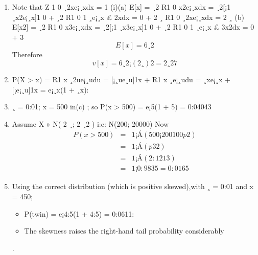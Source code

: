 \documentclass[a4paper,12pt]{article}
\begin{document}
\begin{enumerate}
\item  Note that Z 1
0
¸2xe¡¸xdx = 1
(i)(a)
E[x] = ¸2 R1
0 x2e¡¸xdx = ¸2[¡1
¸x2e¡¸x]1
0 + ¸2 R1
0
1
¸e¡¸x £ 2xdx
= 0 + 2
¸
R1
0 ¸2xe¡¸xdx = 2
¸
(b)
E[x2] = ¸2 R1
0 x3e¡¸xdx = ¸2[¡1
¸x3e¡¸x]1
0 + ¸2 R1
0
1
¸e¡¸x £ 3x2dx
= 0 + 3
\[E[x] = 6
¸2\]
Therefore
\[v[x] =
6
¸2
¡ (
2
¸
)2 =
2
¸2
7\]
\item P(X > x) =
R1
x ¸2ue¡¸udu = [¡¸ue¸u]1x
+
R1
x ¸e¡¸udu
= ¸xe¡¸x + [¡e¡¸u]1x
= e¡¸x(1 + ¸x):
\item  ¸ = 0:01; x = 500 in(c) ; so P(x > 500) = e¡5(1 + 5) = 0:04043
\item Assume X » N( 2
¸; 2
¸2 ) i:e: N(200; 20000)
Now
\begin{eqnarray*}
P(x > 500) &=& 1 ¡ Á( 500¡200
100
p2 ) \\
&=& 1 ¡ Á(p3 2 )\\
&=& 1 ¡ Á(2:1213) \\
&=& 1 ¡ 0:9835 = 0:0165
\end{eqnarray*}
\item Using the correct distribution (which is positive skewed),with ¸ = 0:01 and x = 450;

\begin{itemize}
    \item P(twin) = e¡4:5(1 + 4:5) = 0:0611: 
    \item The skewness raises the right-hand tail probability
considerably
\end{itemize}
.

\end{enumerate}
\end{document}
